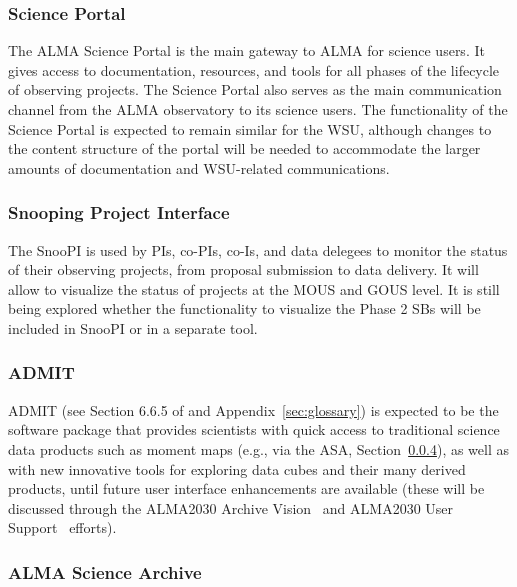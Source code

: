 \subsubsection{Science Portal}

The ALMA Science Portal is the main gateway to ALMA for science users. It gives access to documentation, resources, and tools for all phases of the lifecycle of observing projects. The Science Portal also serves as the main communication channel from the ALMA observatory to its science users. The functionality of the Science Portal is expected to remain similar for the WSU, although changes to the content structure of the portal will be needed to accommodate the larger amounts of documentation and WSU-related communications. 

\subsubsection{Snooping Project Interface}

The \ac{SnooPI} is used by PIs, co-PIs, co-Is, and data delegees to monitor the status of their observing projects, from proposal submission to data delivery. It will allow to visualize the status of projects at the MOUS and GOUS level. It is still being explored whether the functionality to visualize the Phase 2 SBs will be included in SnooPI or in a separate tool.

\subsubsection{ADMIT}\label{sec:ADMIT}
\acf{ADMIT} (see Section 6.6.5 of \cite{CSA-IA} and Appendix~\ref{sec:glossary}) is expected to be the software package that provides scientists with quick access to traditional science data products such as moment maps (e.g., via the \ac{ASA}, Section~\ref{subsec:ASA}), as well as with new innovative tools for exploring data cubes and their many derived products, until future user interface enhancements are available (these will be discussed through the ALMA2030 Archive Vision~\cite{2030_archive_vision} and ALMA2030 User Support~\cite{2030_user_support} efforts).  



\subsubsection{ALMA Science Archive}\label{subsec:ASA}

